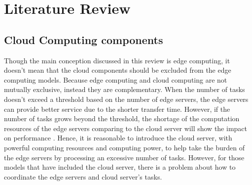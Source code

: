 \documentclass[a4paper,11pt]{article}
\begin{document}






\section{Literature Review}
\subsection{Cloud Computing components}
Though the main conception discussed in this review is edge computing, it doesn't mean that the cloud components should be excluded from the edge computing models. Because edge computing and cloud computing are not mutually exclusive, instead they are complementary. When the number of tasks doesn't exceed a threshold based on the number of edge servers, the edge servers can provide better service due to the shorter transfer time. However, if the number of tasks grows beyond the threshold, the shortage of the computation resources of the edge servers comparing to the cloud server will show the impact on performance \cite{A_Cooperative_Partial_Computation_Offloading_Scheme_for_Mobile_Edge}. Hence, it is reasonable to introduce the cloud server, with powerful computing resources and computing power, to help take the burden of the edge servers by processing an excessive number of tasks. However, for those models that have included the cloud server, there is a problem about how to coordinate the edge servers and cloud server's tasks. \newline
\end{document}
